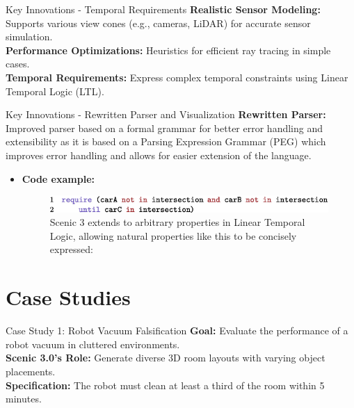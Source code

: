 \documentclass[10pt]{beamer}
\begin{document}
\begin{frame}{Key Innovations - Temporal Requirements}
\textbf{Realistic Sensor Modeling:} Supports various view cones (e.g., cameras, LiDAR) for accurate sensor simulation.\\
\textbf{Performance Optimizations:} Heuristics for efficient ray tracing in simple cases.\\
\textbf{Temporal Requirements:} Express complex temporal constraints using Linear Temporal Logic (LTL).
\end{frame}

\begin{frame}{Key Innovations - Rewritten Parser and Visualization}
\textbf{Rewritten Parser:} Improved parser based on a formal grammar for better error handling and extensibility as it is based on a Parsing Expression Grammar (PEG) which improves error handling and allows for easier extension of the language.
\begin{itemize}
\item \textbf{Code example:}
    \begin{figure}
    \centering
      \includegraphics[width=1\linewidth]{FIG8.png}
        \caption{Scenic 3 extends to arbitrary properties in Linear Temporal Logic, allowing natural properties like this to be concisely expressed:}
        \label{fig:Linear-Temporal-Logic}
    \end{figure}
\end{itemize}
\end{frame}

\section{Case Studies}

\begin{frame}{Case Study 1: Robot Vacuum Falsification}
    \textbf{Goal:} Evaluate the performance of a robot vacuum in cluttered environments.\\
    \textbf{Scenic 3.0's Role:} Generate diverse 3D room layouts with varying object placements.\\
    \textbf{Specification:} The robot must clean at least a third of the room within 5 minutes.
\end{frame}
\end{document}
